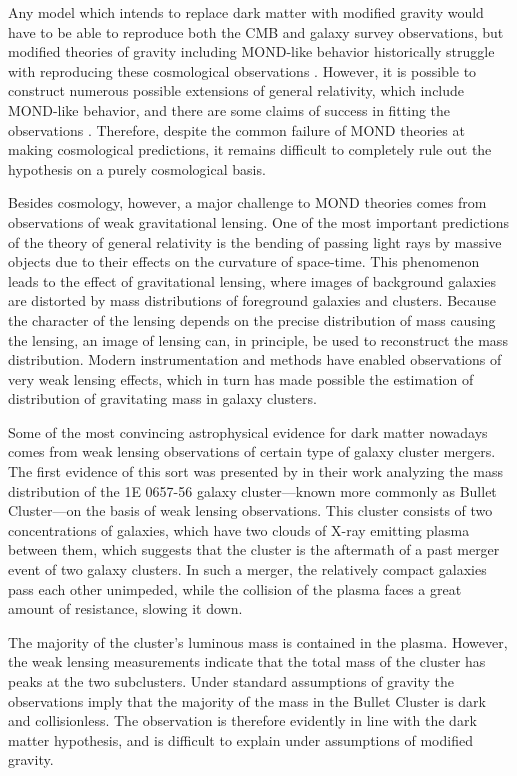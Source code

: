 \documentclass[b5paper, 10pt, twoside]{book}
\begin{document}
Any model which intends to replace dark matter with modified gravity would have to be able to reproduce both the CMB and galaxy survey observations, but modified theories of gravity including MOND-like behavior historically struggle with reproducing these cosmological observations \parencites{XuWangZhang2015, TanWoodard2018, ZlosnikSkordis2017}. However, it is possible to construct numerous possible extensions of general relativity, which include MOND-like behavior, and there are some claims of success in fitting the observations \parencite{SkordisZlosnik2021}. Therefore, despite the common failure of MOND theories at making cosmological predictions, it remains difficult to completely rule out the hypothesis on a purely cosmological basis.

Besides cosmology, however, a major challenge to MOND theories comes from observations of weak gravitational lensing. One of the most important predictions of the theory of general relativity is the bending of passing light rays by massive objects due to their effects on the curvature of space-time. This phenomenon leads to the effect of gravitational lensing, where images of background galaxies are distorted by mass distributions of foreground galaxies and clusters. Because the character of the lensing depends on the precise distribution of mass causing the lensing, an image of lensing can, in principle, be used to reconstruct the mass distribution. Modern instrumentation and methods have enabled observations of very weak lensing effects, which in turn has made possible the estimation of distribution of gravitating mass in galaxy clusters.

Some of the most convincing astrophysical evidence for dark matter nowadays comes from weak lensing observations of certain type of galaxy cluster mergers. The first evidence of this sort was presented by \textcite{CloweEtAl2006} in their work analyzing the mass distribution of the 1E 0657-56 galaxy cluster---known more commonly as Bullet Cluster---on the basis of weak lensing observations. This cluster consists of two concentrations of galaxies, which have two clouds of X-ray emitting plasma between them, which suggests that the cluster is the aftermath of a past merger event of two galaxy clusters. In such a merger, the relatively compact galaxies pass each other unimpeded, while the collision of the plasma faces a great amount of resistance, slowing it down.

The majority of the cluster's luminous mass is contained in the plasma. However, the weak lensing measurements indicate that the total mass of the cluster has peaks at the two subclusters. Under standard assumptions of gravity the observations imply that the majority of the mass in the Bullet Cluster is dark and collisionless. The observation is therefore evidently in line with the dark matter hypothesis, and is difficult to explain under assumptions of modified gravity.
\end{document}
